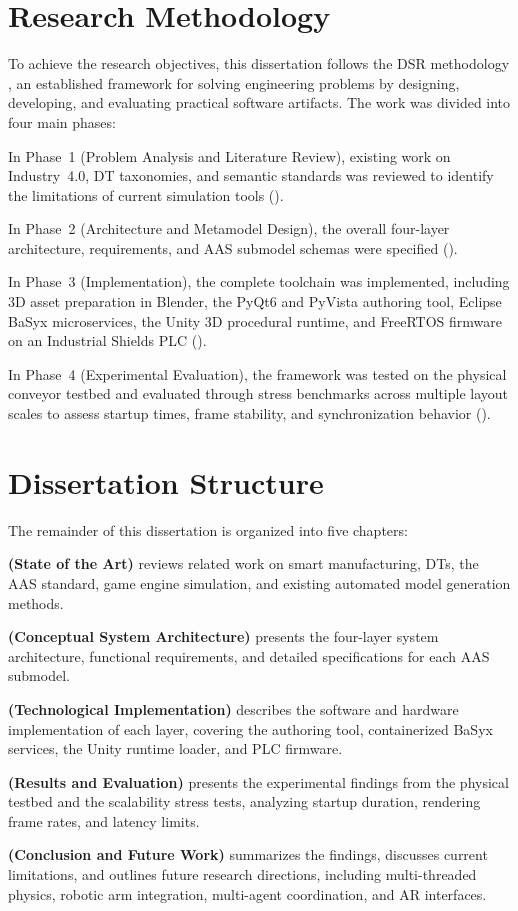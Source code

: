 \section{Research Methodology}
\label{sec:methodology}

To achieve the research objectives, this dissertation follows the \gls{DSR} methodology \cite{Peffers2007}, an established framework for solving engineering problems by designing, developing, and evaluating practical software artifacts. The work was divided into four main phases:

In Phase~1 (Problem Analysis and Literature Review), existing work on Industry~4.0, \gls{DT} taxonomies, and semantic standards was reviewed to identify the limitations of current simulation tools ().

In Phase~2 (Architecture and Metamodel Design), the overall four-layer architecture, requirements, and \gls{AAS} submodel schemas were specified ().

In Phase~3 (Implementation), the complete toolchain was implemented, including 3D asset preparation in Blender, the PyQt6 and PyVista authoring tool, Eclipse BaSyx microservices, the Unity 3D procedural runtime, and FreeRTOS firmware on an Industrial Shields \gls{PLC} ().

In Phase~4 (Experimental Evaluation), the framework was tested on the physical conveyor testbed and evaluated through stress benchmarks across multiple layout scales to assess startup times, frame stability, and synchronization behavior ().

\section{Dissertation Structure}
\label{sec:structure}

The remainder of this dissertation is organized into five chapters:

\textbf{ (State of the Art)} reviews related work on smart manufacturing, \glspl{DT}, the \gls{AAS} standard, game engine simulation, and existing automated model generation methods.

\textbf{ (Conceptual System Architecture)} presents the four-layer system architecture, functional requirements, and detailed specifications for each \gls{AAS} submodel.

\textbf{ (Technological Implementation)} describes the software and hardware implementation of each layer, covering the authoring tool, containerized BaSyx services, the Unity runtime loader, and \gls{PLC} firmware.

\textbf{ (Results and Evaluation)} presents the experimental findings from the physical testbed and the scalability stress tests, analyzing startup duration, rendering frame rates, and latency limits.

\textbf{ (Conclusion and Future Work)} summarizes the findings, discusses current limitations, and outlines future research directions, including multi-threaded physics, robotic arm integration, multi-agent coordination, and \gls{AR} interfaces.